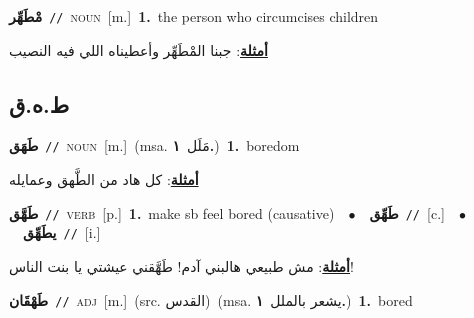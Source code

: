 \documentclass[10pt,a4paper,twoside]{article} %
\begin{document}
\begin{multicols}{2}
{\setlength\topsep{0pt}\textbf{\foreignlanguage{arabic}{مْطَهِّر}}\ {\color{gray}\texttt{//}\color{black}}\ \textsc{noun}\ [m.]\ \textbf{1.}~the person who circumcises children\  \begin{flushright}\color{gray}\foreignlanguage{arabic}{\textbf{\underline{\foreignlanguage{arabic}{أمثلة}}}: جبنا المْطَهِّر وأعطيناه اللي فيه النصيب}\end{flushright}\color{black}} \vspace{2mm}

\vspace{-3mm}
\subsection*{\color{blue}\foreignlanguage{arabic}{ط.ه.ق}\color{blue}{}} 

{\setlength\topsep{0pt}\textbf{\foreignlanguage{arabic}{طَهَق}}\ {\color{gray}\texttt{//}\color{black}}\ \textsc{noun}\ [m.]\ \color{gray}(msa. \foreignlanguage{arabic}{مَلَل}~\foreignlanguage{arabic}{\textbf{١.}})\color{black}\ \textbf{1.}~boredom\  \begin{flushright}\color{gray}\foreignlanguage{arabic}{\textbf{\underline{\foreignlanguage{arabic}{أمثلة}}}: كل هاد من الطَّهق وعمايله}\end{flushright}\color{black}} \vspace{2mm}

{\setlength\topsep{0pt}\textbf{\foreignlanguage{arabic}{طَهَّق}}\ {\color{gray}\texttt{//}\color{black}}\ \textsc{verb}\ [p.]\ \textbf{1.}~make sb feel bored (causative)\ \ $\bullet$\ \ \setlength\topsep{0pt}\textbf{\foreignlanguage{arabic}{طَهِّق}}\ {\color{gray}\texttt{//}\color{black}}\ [c.]\ \ $\bullet$\ \ \setlength\topsep{0pt}\textbf{\foreignlanguage{arabic}{يطَهِّق}}\ {\color{gray}\texttt{//}\color{black}}\ [i.]\  \begin{flushright}\color{gray}\foreignlanguage{arabic}{\textbf{\underline{\foreignlanguage{arabic}{أمثلة}}}: مش طبيعي هالبني آدم! طَهَّقني عيشتي يا بنت الناس!}\end{flushright}\color{black}} \vspace{2mm}

{\setlength\topsep{0pt}\textbf{\foreignlanguage{arabic}{طَهْقَان}}\ {\color{gray}\texttt{//}\color{black}}\ \textsc{adj}\ [m.]\ (src. \color{gray}\foreignlanguage{arabic}{القدس}\color{black})\ \color{gray}(msa. \foreignlanguage{arabic}{يشعر بالملل}~\foreignlanguage{arabic}{\textbf{١.}})\color{black}\ \textbf{1.}~bored\ } \vspace{2mm}


\end{multicols}
\end{document}

